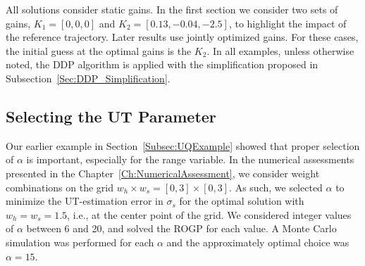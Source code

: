 All solutions consider static gains. In the first section we consider two sets of gains, $K_1=[0,0,0]$ and $K_2 = [0.13,-0.04,-2.5]$, to highlight the impact of the reference trajectory. Later results use jointly optimized gains. For these cases, the initial guess at the optimal gains is the $K_2$. In all examples, unless otherwise noted, the DDP algorithm is applied with the simplification proposed in Subsection~\ref{Sec:DDP_Simplification}.

\subsection{Selecting the UT Parameter}

Our earlier example in Section~\ref{Subsec:UQExample} showed that proper selection of $\alpha$ is important, especially for the range variable. In the numerical assessments presented in the Chapter~\ref{Ch:NumericalAssessment}, we consider weight combinations on the grid $w_h\times w_s = [0,3]\times[0,3]$. As such, we selected $\alpha$ to minimize the UT-estimation error in $\sigma_s$ for the optimal solution with $w_h=w_s=1.5$, i.e., at the center point of the grid. We considered integer values of $\alpha$ between 6 and 20, and solved the ROGP for each value. A Monte Carlo simulation was performed for each $\alpha$ and the approximately optimal choice was $\alpha=15$. 

